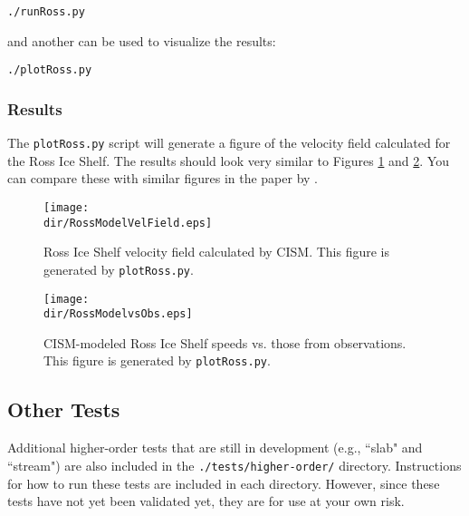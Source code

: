 \texttt{./runRoss.py}

and another can be used to visualize the results:

\texttt{./plotRoss.py}

\subsubsection{Results}
The \texttt{plotRoss.py} script will generate a figure of the velocity field
calculated for the Ross Ice Shelf.  The results should look very similar to Figures \ref{fig:rossresults1} and \ref{fig:rossresults2}. You can
compare these with similar figures in the paper by \citet{MacAyeal:1996vn}.

\begin{figure}[H!]
	\centering
	\texttt{[image: \\dir/RossModelVelField.eps]}
	\caption{Ross Ice Shelf velocity field calculated by CISM. This figure is generated by \texttt{plotRoss.py}.}
	\label{fig:rossresults1}
\end{figure}

\begin{figure}[H!]
	\centering
	\texttt{[image: \\dir/RossModelvsObs.eps]}
	\caption{CISM-modeled Ross Ice Shelf speeds vs. those from observations. This figure is generated by \texttt{plotRoss.py}.}
	\label{fig:rossresults2}
\end{figure}
\FloatBarrier


\subsection{Other Tests}
Additional higher-order tests that are still in development (e.g., ``slab" and ``stream") are also included in the \texttt{./tests/higher-order/}
directory. Instructions for how to run these tests are included in each directory. However, since these tests have not yet been validated yet, 
they are for use at your own risk.



